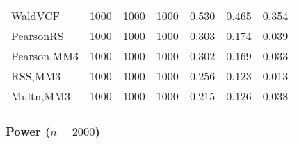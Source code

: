 \documentclass[
]{article}
\begin{document}
\begin{table}[H]
{\begin{tabular}[t]{lrrrrrr}
\hspace{1em}WaldVCF & 1000 & 1000 & 1000 & 0.530 & 0.465 & 0.354\\
\hspace{1em}PearsonRS & 1000 & 1000 & 1000 & 0.303 & 0.174 & 0.039\\
\hspace{1em}Pearson,MM3 & 1000 & 1000 & 1000 & 0.302 & 0.169 & 0.033\\
\hspace{1em}RSS,MM3 & 1000 & 1000 & 1000 & 0.256 & 0.123 & 0.013\\
\hspace{1em}Multn,MM3 & 1000 & 1000 & 1000 & 0.215 & 0.126 & 0.038\\
\bottomrule
\end{tabular}}
\endgroup{}
\end{table}

\hypertarget{power-n2000-2}{%
\subsubsection{\texorpdfstring{Power
(\(n=2000\))}{Power (n=2000)}}\label{power-n2000-2}}
\end{document}
